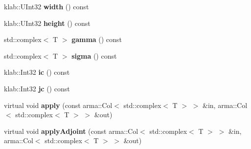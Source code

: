 \begin{DoxyCompactItemize}
\item 
klab\+::\+U\+Int32 {\bfseries width} () const \hypertarget{classkl1p_1_1TInverseGaussianBlur2DOperator_3_01std_1_1complex_3_01T_01_4_01_4_a1534188f713e5a0f959ecac2975341f0}{}\label{classkl1p_1_1TInverseGaussianBlur2DOperator_3_01std_1_1complex_3_01T_01_4_01_4_a1534188f713e5a0f959ecac2975341f0}

\item 
klab\+::\+U\+Int32 {\bfseries height} () const \hypertarget{classkl1p_1_1TInverseGaussianBlur2DOperator_3_01std_1_1complex_3_01T_01_4_01_4_a9dbe406bd78c50f52a6ee339b6f569d7}{}\label{classkl1p_1_1TInverseGaussianBlur2DOperator_3_01std_1_1complex_3_01T_01_4_01_4_a9dbe406bd78c50f52a6ee339b6f569d7}

\item 
std\+::complex$<$ T $>$ {\bfseries gamma} () const \hypertarget{classkl1p_1_1TInverseGaussianBlur2DOperator_3_01std_1_1complex_3_01T_01_4_01_4_a323bf8c27f47a7fc874bbef4a1b43486}{}\label{classkl1p_1_1TInverseGaussianBlur2DOperator_3_01std_1_1complex_3_01T_01_4_01_4_a323bf8c27f47a7fc874bbef4a1b43486}

\item 
std\+::complex$<$ T $>$ {\bfseries sigma} () const \hypertarget{classkl1p_1_1TInverseGaussianBlur2DOperator_3_01std_1_1complex_3_01T_01_4_01_4_a04bb96e7e678238de44dc35cef23604a}{}\label{classkl1p_1_1TInverseGaussianBlur2DOperator_3_01std_1_1complex_3_01T_01_4_01_4_a04bb96e7e678238de44dc35cef23604a}

\item 
klab\+::\+Int32 {\bfseries ic} () const \hypertarget{classkl1p_1_1TInverseGaussianBlur2DOperator_3_01std_1_1complex_3_01T_01_4_01_4_a8616d79f9910edc7515942202dfe2d61}{}\label{classkl1p_1_1TInverseGaussianBlur2DOperator_3_01std_1_1complex_3_01T_01_4_01_4_a8616d79f9910edc7515942202dfe2d61}

\item 
klab\+::\+Int32 {\bfseries jc} () const \hypertarget{classkl1p_1_1TInverseGaussianBlur2DOperator_3_01std_1_1complex_3_01T_01_4_01_4_a6b74c0f055a018f7a90a5e6ed068b345}{}\label{classkl1p_1_1TInverseGaussianBlur2DOperator_3_01std_1_1complex_3_01T_01_4_01_4_a6b74c0f055a018f7a90a5e6ed068b345}

\item 
virtual void {\bfseries apply} (const arma\+::\+Col$<$ std\+::complex$<$ T $>$ $>$ \&in, arma\+::\+Col$<$ std\+::complex$<$ T $>$ $>$ \&out)\hypertarget{classkl1p_1_1TInverseGaussianBlur2DOperator_3_01std_1_1complex_3_01T_01_4_01_4_a8da539182382ff6e549ddd13f9c79366}{}\label{classkl1p_1_1TInverseGaussianBlur2DOperator_3_01std_1_1complex_3_01T_01_4_01_4_a8da539182382ff6e549ddd13f9c79366}

\item 
virtual void {\bfseries apply\+Adjoint} (const arma\+::\+Col$<$ std\+::complex$<$ T $>$ $>$ \&in, arma\+::\+Col$<$ std\+::complex$<$ T $>$ $>$ \&out)\hypertarget{classkl1p_1_1TInverseGaussianBlur2DOperator_3_01std_1_1complex_3_01T_01_4_01_4_a0505bd5da004ae75e1ee79323a414bab}{}\label{classkl1p_1_1TInverseGaussianBlur2DOperator_3_01std_1_1complex_3_01T_01_4_01_4_a0505bd5da004ae75e1ee79323a414bab}

\end{DoxyCompactItemize}
